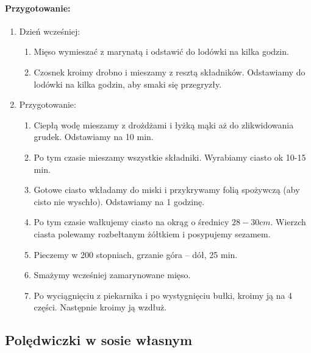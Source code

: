 \documentclass{article}
\begin{document}
    \paragraph{Przygotowanie:}
    \begin{enumerate}
    \item Dzień wcześniej:
    \begin{enumerate}
        \item Mięso wymieszać z marynatą i odstawić do lodówki na kilka godzin.
        \item Czosnek kroimy drobno i mieszamy z resztą składników. Odstawiamy
            do lodówki na kilka godzin, aby smaki się przegryzły.
    \end{enumerate}
    \item Przygotowanie:
    \begin{enumerate}
        \item Ciepłą wodę mieszamy z drożdżami i łyżką mąki aż do zlikwidowania
            grudek. Odstawiamy na 10 min.
        \item Po tym czasie mieszamy wszystkie składniki. Wyrabiamy ciasto ok
            10-15 min.
        \item Gotowe ciasto wkładamy do miski i przykrywamy folią spożywczą (aby
            cisto nie wyschło). Odstawiamy na 1 godzinę.
        \item Po tym czasie wałkujemy ciasto na okrąg o średnicy $28-30cm$.
            Wierzch ciasta polewamy rozbełtanym żółtkiem i posypujemy sezamem.
        \item Pieczemy w 200 stopniach, grzanie góra – dół, 25 min.
        \item Smażymy wcześniej zamarynowane mięso.
        \item Po wyciągnięciu z piekarnika i po wystygnięciu bułki, kroimy ją na
            4 części. Następnie kroimy ją wzdłuż.
    \end{enumerate}
    \end{enumerate}
    \newpage


    \subsection{Polędwiczki w sosie własnym}
    \bigskip
\end{document}
